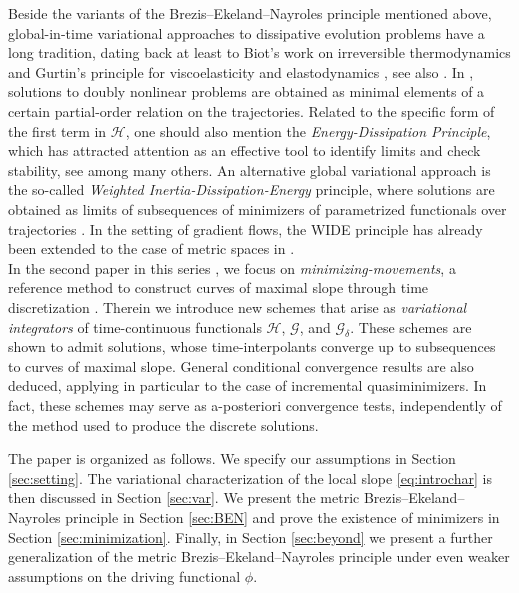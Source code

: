 \documentclass[10pt,a4paper]{amsart}
\newcommand{\GG}{{\mathcal G}}
\newcommand{\HH}{{\mathcal H}}
\begin{document}
Beside  the variants of the Brezis--Ekeland--Nayroles
principle mentioned above, global-in-time variational
approaches to dissipative evolution problems have  a long
tradition, dating back at least to Biot's work on irreversible
thermodynamics \cite{Biot55} and Gurtin's principle for
viscoelasticity and elastodynamics
\cite{Gurtin63,Gurtin64b}, see also \cite{Hlavacek69}. In \cite{Visintin01}, solutions to
doubly nonlinear problems are obtained as minimal elements of a
certain partial-order relation on the trajectories. Related to the
specific form  of  the first term in $\HH$, one should also mention the
{\it Energy-Dissipation Principle}, which has attracted
attention  as  an effective tool to identify limits and check
stability, see
\cite{Dondl19,Frenzel,Mielke20,Mielke21,Sandier04,Serfaty11} among
many others.
An alternative global variational approach is the so-called {\it
  Weighted Inertia-Dissipation-Energy} principle, where
solutions are obtained as limits of subsequences of minimizers of
parametrized functionals over trajectories
\cite{Stefanelli25}.
In the setting of gradient flows, the WIDE principle has already been extended to the case of metric spaces in \cite{Rossi11,Rossi19}.\\

 In the second
paper  in  this series  
  \cite{cuore3}, we focus on {\it minimizing-movements}, a reference method to construct curves of maximal slope through 
time discretization \cite{Ambrosio95}. Therein we introduce new schemes  that arise as    {\it variational integrators}
 of time-continuous functionals $\HH$, $\GG$, and $\GG_\delta$. 
  These schemes
 are  shown  to  admit  solutions, whose
time-interpolants converge up to subsequences  to
curves of maximal slope. General conditional convergence results are
also deduced, applying in particular to the case of incremental
quasiminimizers.  In fact, these schemes may serve as a-posteriori convergence  tests, independently  of 
the method used to produce the discrete solutions.  

 The paper is organized as follows. We specify our
  assumptions in Section \ref{sec:setting}. The variational
  characterization of the local slope \eqref{eq:introchar} is then
  discussed in Section \ref{sec:var}. We present the metric
  Brezis--Ekeland--Nayroles principle in Section
  \ref{sec:BEN} and prove the existence of minimizers in Section
  \ref{sec:minimization}.  Finally,    in Section
  \ref{sec:beyond}  we present a further
  generalization of the metric Brezis--Ekeland--Nayroles principle
  under even weaker assumptions on the driving functional $\phi$.
\end{document}
